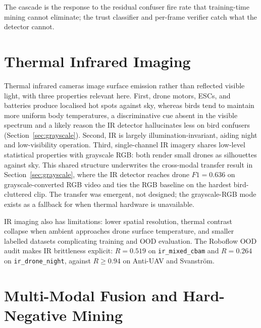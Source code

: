 The cascade is the response to the residual confuser fire rate that training-time mining cannot eliminate; the trust classifier and per-frame verifier catch what the detector cannot.

\section{Thermal Infrared Imaging}
\label{sec:lit_ir}

Thermal infrared cameras image surface emission rather than reflected visible light, with three properties relevant here. First, drone motors, ESCs, and batteries produce localised hot spots against sky, whereas birds tend to maintain more uniform body temperatures, a discriminative cue absent in the visible spectrum and a likely reason the IR detector hallucinates less on bird confusers (Section~\ref{sec:grayscale}). Second, IR is largely illumination-invariant, aiding night and low-visibility operation. Third, single-channel IR imagery shares low-level statistical properties with grayscale RGB: both render small drones as silhouettes against sky. This shared structure underwrites the cross-modal transfer result in Section~\ref{sec:grayscale}, where the IR detector reaches drone $F1=0.636$ on grayscale-converted RGB video and ties the RGB baseline on the hardest bird-cluttered clip. The transfer was emergent, not designed; the grayscale-RGB mode exists as a fallback for when thermal hardware is unavailable.

IR imaging also has limitations: lower spatial resolution, thermal contrast collapse when ambient approaches drone surface temperature, and smaller labelled datasets complicating training and OOD evaluation. The Roboflow OOD audit makes IR brittleness explicit: $R=0.519$ on \texttt{ir\_mixed\_cbam} and $R=0.264$ on \texttt{ir\_drone\_night}, against $R\geq 0.94$ on Anti-UAV and Svanstr\"om.

\section{Multi-Modal Fusion and Hard-Negative Mining}
\label{sec:lit_fusion}

